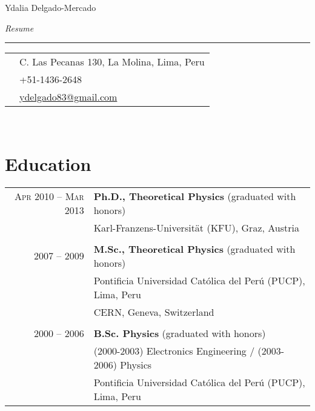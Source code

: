 \documentclass[a4paper, 10pt]{article}
\begin{document}
\color{text1} %
\begin{minipage}{0.45\textwidth} %
\par{\centering
{\sffamily\huge Ydalia Delgado-Mercado}\\   
{\color{black}  \em \rmfamily \Large Resume \\[25pt]\par}
{\color{white} \hrule} %
}       
\end{minipage}
\begin{minipage}{0.55\textwidth} %
\colorbox{shade}{\textcolor{text1}{
\begin{tabular}{c|p{8cm}}
    & C. Las Pecanas 130,
    La Molina, Lima,
    Peru \\
    \raisebox{-0pt}{\Telefon}   &+51-1436-2648\\
    \raisebox{-0pt}{\Letter}
    &\href{mailto:ydelgado83@gmail.com}
        {ydelgado83@gmail.com} \\
\end{tabular}
}
}\\[12pt]
\end{minipage}

\vspace{0pt} %
\section{Education}
\vspace*{-3mm}
\begin{longtable}{rl}
    \textsc{Apr} 2010 -- \textsc{Mar} 2013 & \textbf{Ph.D., Theoretical Physics} (graduated with honors)\\
     & Karl-Franzens-Universit\"at (KFU), Graz, Austria\\
     \vspace*{-3mm}
     &\\
    2007 -- 2009 & \textbf{M.Sc., Theoretical Physics} (graduated with honors)\\
     & Pontificia Universidad Cat\'olica del Per\'u (PUCP), Lima, Peru\\
     & CERN, Geneva, Switzerland\\
     \vspace*{-3mm}
     &\\
    2000 -- 2006 & \textbf{B.Sc. Physics} (graduated with honors)\\
    & (2000-2003) Electronics Engineering / (2003-2006) Physics\\
    & Pontificia Universidad Cat\'olica del Per\'u (PUCP), Lima, Peru\\
\end{longtable}
\end{document}
